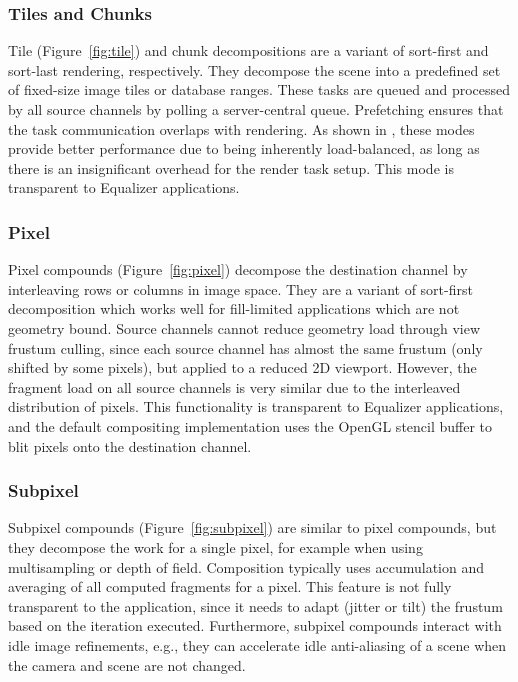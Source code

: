\documentclass[10pt,journal,compsoc]{IEEEtran}
\newcommand{\fig}[1]{Figure~\ref{#1}}
\begin{document}
\subsubsection{Tiles and Chunks}\label{sec:tile}

Tile (\fig{fig:tile}) and chunk decompositions are a variant of sort-first and
sort-last rendering, respectively. They decompose the scene into a predefined
set of fixed-size image tiles or database ranges. These tasks are queued and
processed by all source channels by polling a server-central queue. Prefetching
ensures that the task communication overlaps with rendering. As shown in
\cite{SPEP:16}, these modes provide better performance due to being inherently
load-balanced, as long as there is an insignificant overhead for the render task
setup. This mode is transparent to Equalizer applications.


\subsubsection{Pixel}

Pixel compounds (\fig{fig:pixel}) decompose the destination channel by
interleaving rows or columns in image space. They are a variant of sort-first
decomposition which works well for fill-limited applications which are not
geometry bound. Source channels cannot reduce geometry load through view frustum
culling, since each source channel has almost the same frustum (only shifted by
some pixels), but applied to a reduced 2D viewport. However, the fragment load
on all source channels is very similar due to the interleaved distribution of
pixels. This functionality is transparent to Equalizer applications, and the
default compositing implementation uses the OpenGL stencil buffer to blit pixels
onto the destination channel.

\subsubsection{Subpixel}

Subpixel compounds (\fig{fig:subpixel}) are similar to pixel compounds, but they
decompose the work for a single pixel, for example when using multisampling or
depth of field. Composition typically uses accumulation and averaging of all
computed fragments for a pixel. This feature is not fully transparent to the
application, since it needs to adapt (jitter or tilt) the frustum based on the
iteration executed. Furthermore, subpixel compounds interact with idle image
refinements, e.g., they can accelerate idle anti-aliasing of a scene when the
camera and scene are not changed.
\end{document}

